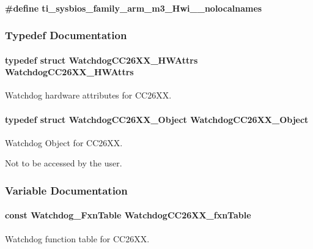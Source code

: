 \paragraph[{ti\+\_\+sysbios\+\_\+family\+\_\+arm\+\_\+m3\+\_\+\+Hwi\+\_\+\+\_\+nolocalnames}]{\setlength{\rightskip}{0pt plus 5cm}\#define ti\+\_\+sysbios\+\_\+family\+\_\+arm\+\_\+m3\+\_\+\+Hwi\+\_\+\+\_\+nolocalnames}\label{_watchdog_c_c26_x_x_8h_aaa17ecf48f5762e2e1bdb0bab8aacf0c}


\subsubsection{Typedef Documentation}
\paragraph[{Watchdog\+C\+C26\+X\+X\+\_\+\+H\+W\+Attrs}]{\setlength{\rightskip}{0pt plus 5cm}typedef struct {\bf Watchdog\+C\+C26\+X\+X\+\_\+\+H\+W\+Attrs}  {\bf Watchdog\+C\+C26\+X\+X\+\_\+\+H\+W\+Attrs}}\label{_watchdog_c_c26_x_x_8h_a3c5c1fb8e79e0ffbefbc0c6077490157}


Watchdog hardware attributes for C\+C26\+X\+X. 

\paragraph[{Watchdog\+C\+C26\+X\+X\+\_\+\+Object}]{\setlength{\rightskip}{0pt plus 5cm}typedef struct {\bf Watchdog\+C\+C26\+X\+X\+\_\+\+Object}  {\bf Watchdog\+C\+C26\+X\+X\+\_\+\+Object}}\label{_watchdog_c_c26_x_x_8h_a1974637ff573d5fb1e141f263ac5361f}


Watchdog Object for C\+C26\+X\+X. 

Not to be accessed by the user. 

\subsubsection{Variable Documentation}
\paragraph[{Watchdog\+C\+C26\+X\+X\+\_\+fxn\+Table}]{\setlength{\rightskip}{0pt plus 5cm}const {\bf Watchdog\+\_\+\+Fxn\+Table} Watchdog\+C\+C26\+X\+X\+\_\+fxn\+Table}\label{_watchdog_c_c26_x_x_8h_a1f60b940055d37c5bf8545499e948ca3}


Watchdog function table for C\+C26\+X\+X. 

